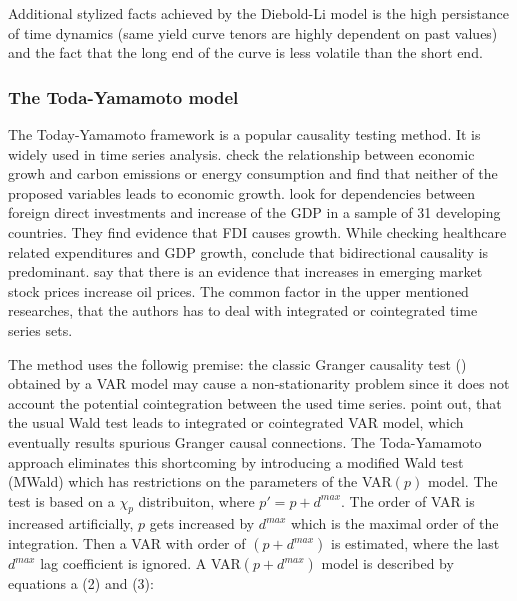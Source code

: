 \documentclass[12pt,bibliography=totoc]{article}
\begin{document}
Additional stylized facts achieved by the Diebold-Li model is the high persistance of time dynamics (same yield curve tenors are highly dependent on past values) and the fact that the long end of the curve is less volatile than the short end.


\subsubsection{The Toda-Yamamoto model}

The Today-Yamamoto framework is a popular causality testing method. It is widely used in time series analysis. \cite{zhang2009energy} check the relationship between economic growh and carbon emissions or energy consumption and find that neither of the proposed variables leads to economic growth. \cite{hansen2006causal} look for dependencies between foreign direct investments and increase of the GDP in a sample of 31 developing countries. They find evidence that FDI causes growth.  While checking healthcare related expenditures and GDP growth, \cite{amiri2012granger} conclude that bidirectional causality is predominant. \cite{basher2012oil} say that there is an evidence that increases in emerging market stock prices increase oil prices. The common factor in the upper mentioned researches, that the authors has to deal with integrated or cointegrated time series sets.

The \cite{toda1995statistical} method uses the followig premise: the classic Granger causality test (\cite{granger1969investigating}) obtained by a VAR model may cause a non-stationarity problem since it does not account the potential cointegration between the used time series.
\cite{toda1995statistical} point out, that the usual Wald test leads to integrated or cointegrated VAR model, which eventually results spurious Granger causal connections. The Toda-Yamamoto approach eliminates this shortcoming by introducing a modified Wald test (MWald) which has restrictions on the parameters of the VAR$(p)$ model. The test is based on a  $\chi_{p}$  distribuiton, where $p' = p + d^{max}$. The order of VAR is increased artificially, $p$ gets increased by $d^{max}$ which is the maximal order of the integration. Then a VAR with order of $(p + d^{max})$ is estimated, where the last  $d^{max}$ lag coefficient is ignored. A VAR$(p + d^{max})$  model is described by equations a (2) and (3):
\end{document}
